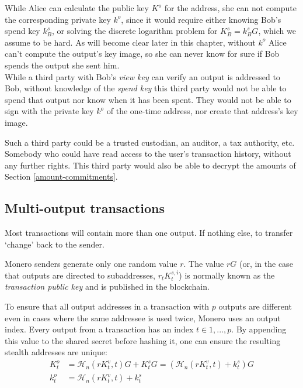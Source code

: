 While Alice can calculate the public key $K^o$ for the address, she can not compute the corresponding private key $k^o$, since it would require either knowing Bob’s spend key $k_B^s$, or solving the discrete logarithm problem for $K_B^s = k_B^s G$, which we assume to be hard. As will become clear later in this chapter, without $k^o$ Alice can't compute the output's key image, so she can never know for sure if Bob spends the output she sent him.
\\

While a third party with Bob’s {\em view key} can verify an output is addressed to Bob, without knowledge of the {\em spend key} this third party would not be able to spend that output nor know when it has been spent. They would not be able to sign with the private key $k^o$ of the one-time address, nor create that address's key image.

Such a third party could be a trusted custodian, an auditor, a tax authority, etc. Somebody who could have read access to the user’s transaction history, without any further rights. This third party would also be able to decrypt the amounts of Section \ref{amount-commitments}.


\subsection{Multi-output transactions}
\label{sec:multi_out_transactions}

Most transactions will contain more than one output. If nothing else, to transfer `change’ back to the sender.

Monero senders generate only one random value $r$. The value $r G$ (or, in the case that outputs are directed to subaddresses, $r_t K_t^{s,i}$) is normally known as the {\em transaction public key} and is published in the blockchain.

To ensure that all output addresses in a transaction with $p$ outputs are different even in cases where the same addressee is used twice, Monero uses an output index. Every output from a transaction has an index $t \in {1, ..., p}$. By appending this value to the shared secret before hashing it, one can ensure the resulting stealth addresses are unique:\\
\begin{align*}
  K_t^o &= \mathcal{H}_n(r K_t^v, t)G + K_t^s G = (\mathcal{H}_n(r K_t^v, t) + k_t^s)G  \\ 
  k_t^o &= \mathcal{H}_n(r K_t^v, t) + k_t^s
\end{align*} 


